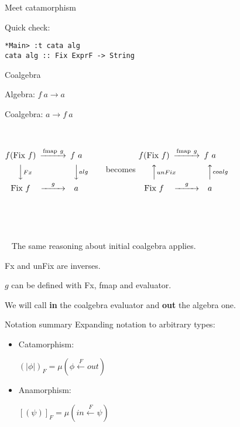 \documentclass{beamer}
\newcommand{\hin}[2]{}
\begin{document}
\begin{frame}[fragile]{Meet catamorphism}

\hin{110}{110}


\hin{115}{116}

Quick check:

\hin{43}{46}

\begin{verbatim}
*Main> :t cata alg
cata alg :: Fix ExprF -> String
\end{verbatim}
\end{frame}


\begin{frame}[fragile]{Coalgebra}

Algebra: $f\ a \rightarrow a$

Coalgebra: $a \rightarrow f\ a$

~

$
\begin{CD}
f (\text{Fix} \ f) @>\text{fmap} \ g>> f\ a\\
@VVFxV @VValgV\\
\text{Fix} \ f @>g>> a
\end{CD}
$
~~~~~becomes 
$
\begin{CD}
f (\text{Fix} \ f) @>\text{fmap} \ g>> f\ a\\
@AAunFixA @AAcoalgA\\
\text{Fix} \ f @>g>> a
\end{CD}
$

~

~

~
The same reasoning about initial coalgebra applies.

Fx and unFix are inverses.

$g$ can be defined with Fx, fmap and evaluator.

We will call \textbf{in} the coalgebra evaluator and \textbf{out} the algebra one.

\end{frame}

\begin{frame}{Notation summary}
Expanding notation to arbitrary types:
\begin{itemize}
\item Catamorphism:

$(\!|\phi|\!)_F = \mu(\phi \xleftarrow{F} out)$ 

\item Anamorphism:

$[\!(\psi)\!]_F = \mu(in \xleftarrow{F} \psi )$ 


\end{itemize}

\end{frame}
\end{document}
